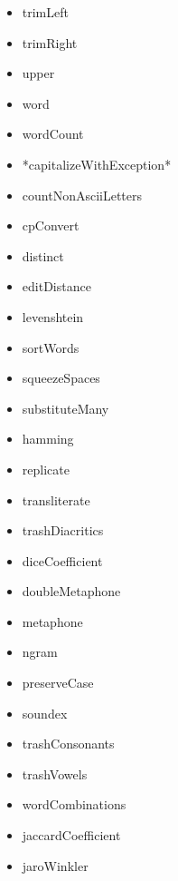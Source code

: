 \begin{itemize}
\begin{itemize}
        \item trimLeft
        \item trimRight
        \item upper
        \item word
        \item wordCount
        \item *capitalizeWithException*
        \item countNonAsciiLetters
        \item cpConvert
        \item distinct
        \item editDistance
        \item levenshtein
        \item sortWords
        \item squeezeSpaces
        \item substituteMany
        \item hamming
        \item replicate
        \item transliterate
        \item trashDiacritics
        \item diceCoefficient
        \item doubleMetaphone
        \item metaphone
        \item ngram
        \item preserveCase
        \item soundex
        \item trashConsonants
        \item trashVowels
        \item wordCombinations
        \item jaccardCoefficient
        \item jaroWinkler
    \end{itemize}
\end{itemize}
